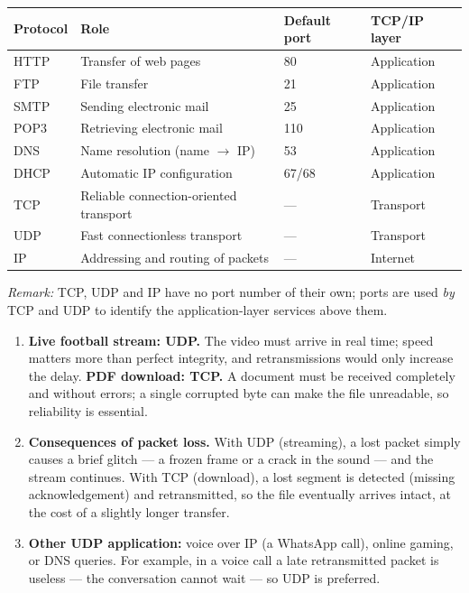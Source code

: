 \documentclass[11pt]{article}
\begin{document}
\begin{corrige}
\begin{center}
\begin{tabularx}{\linewidth}{|l|X|l|l|}
\hline
\rowcolor{popblueL} \textbf{Protocol} & \textbf{Role} & \textbf{Default port} & \textbf{TCP/IP layer} \\
\hline
HTTP & Transfer of web pages & 80 & Application \\
\hline
FTP & File transfer & 21 & Application \\
\hline
SMTP & Sending electronic mail & 25 & Application \\
\hline
POP3 & Retrieving electronic mail & 110 & Application \\
\hline
DNS & Name resolution (name $\rightarrow$ IP) & 53 & Application \\
\hline
DHCP & Automatic IP configuration & 67/68 & Application \\
\hline
TCP & Reliable connection-oriented transport & --- & Transport \\
\hline
UDP & Fast connectionless transport & --- & Transport \\
\hline
IP & Addressing and routing of packets & --- & Internet \\
\hline
\end{tabularx}
\end{center}
\emph{Remark:} TCP, UDP and IP have no port number of their own; ports are used \emph{by} TCP and UDP to identify the application-layer services above them.
\end{corrige}

\begin{corrige}
\begin{enumerate}
\item \textbf{Live football stream: UDP.} The video must arrive in real time; speed matters more than perfect integrity, and retransmissions would only increase the delay. \textbf{PDF download: TCP.} A document must be received completely and without errors; a single corrupted byte can make the file unreadable, so reliability is essential.
\item \textbf{Consequences of packet loss.} With UDP (streaming), a lost packet simply causes a brief glitch — a frozen frame or a crack in the sound — and the stream continues. With TCP (download), a lost segment is detected (missing acknowledgement) and retransmitted, so the file eventually arrives intact, at the cost of a slightly longer transfer.
\item \textbf{Other UDP application:} voice over IP (a WhatsApp call), online gaming, or DNS queries. For example, in a voice call a late retransmitted packet is useless — the conversation cannot wait — so UDP is preferred.
\end{enumerate}
\end{corrige}
\end{document}
